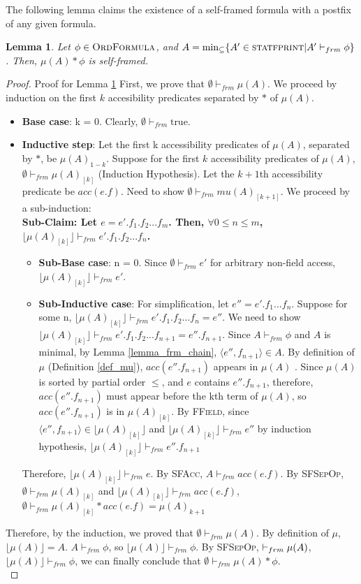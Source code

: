 \documentclass {article}
\newtheorem{lemma}[theorem]{Lemma}
\newcommand{\true}{\text{true}}
\newcommand{\frm}{\vdash_{frm}}
\begin{document}
The following lemma claims the existence of a self-framed formula with a postfix of any given formula.\\
\begin{lemma}
\label{lemma_mu}
Let $\phi \in \textsc{OrdFormula}$, and $A = \min_{\subseteq}\{A' \in \textsc{statfprint} | A' \frm \phi\}$. Then, $\mu(A) \ast \phi$ is self-framed.
\end{lemma}
\begin{proof} Proof for Lemma \ref{lemma_mu}
First, we prove that $\emptyset \frm \mu(A)$. We proceed by induction on the first $k$ accesibility predicates separated by $\ast$ of $\mu(A)$.
\begin{itemize}
    \item \textbf{Base case}: k = 0. Clearly, $\emptyset \frm \true$.
    \item \textbf{Inductive step}: Let the first k accessibility predicates of $\mu(A)$, separated by $\ast$, be $\mu(A)_{1-k}$. Suppose for the first $k$ accessibility predicates of $\mu(A)$, $\emptyset \frm \mu(A)_{[k]}$ (Induction Hypothesis). Let the $k+1$th accessibility predicate be $acc(e.f)$. Need to show $\emptyset \frm mu(A)_{[k+1]}$. We proceed by a sub-induction:\\
    \textbf{Sub-Claim: Let $e = e'.f_1.f_2...f_m$. Then, $\forall 0 \leqslant n \leqslant m$, $\lfloor \mu(A)_{[k]} \rfloor \frm e'.f_1.f_2...f_n$.}
    \begin{itemize}
        \item \textbf{Sub-Base case}: n = 0. Since $\emptyset \frm e'$ for arbitrary non-field access, $\lfloor \mu(A)_{[k]} \rfloor \frm e'$.
        \item\textbf{ Sub-Inductive case}: For simplification, let $e'' = e'.f_1...f_n$. Suppose for some n, $\lfloor \mu(A)_{[k]} \rfloor \frm e'.f_1.f_2...f_n = e''$.  We need to show $\lfloor \mu(A)_{[k]} \rfloor \frm e'.f_1.f_2...f_{n+1} = e''.f_{n+1}$.  Since $A \frm \phi$ and $A$ is minimal, by Lemma \ref{lemma_frm_chain}, $\langle e'',f_{n+1} \rangle \in A$. By definition of $\mu$ (Definition \ref{def_mu}), $acc(e''.f_{n+1})$ appears in $\mu(A)$ . Since $\mu(A)$ is sorted by partial order $\leq$, and $e$ contains $e''.f_{n+1}$, therefore, $acc(e''.f_{n+1})$ must appear before the kth term of $\mu(A)$, so $acc(e''.f_{n+1})$ is in $\mu(A)_{[k]}$. By \textsc{FField}, since $\langle e'',f_{n+1}\rangle \in \lfloor \mu(A)_{[k]} \rfloor$ and $\lfloor \mu(A)_{[k]} \rfloor \frm e''$ by induction hypothesis, $\lfloor \mu(A)_{[k]} \rfloor \frm e''.f_{n+1}$
    \end{itemize}
    Therefore, $\lfloor \mu(A)_{[k]} \rfloor \frm e$. By \textsc{SFAcc}, $A \frm acc(e.f)$. By \textsc{SFSepOp}, $\emptyset \frm \mu(A)_{[k]}$ and $\lfloor \mu(A)_{[k]} \rfloor \frm acc(e.f)$, $\emptyset \frm \mu(A)_{[k]} \ast acc(e.f) = \mu(A)_{k+1}$
\end{itemize}
Therefore, by the induction, we proved that $\emptyset \frm \mu(A)$. By definition of $\mu$, $\lfloor \mu(A) \rfloor = A$. $A \frm \phi$, so $\lfloor \mu(A) \rfloor \frm \phi$. By \textsc{SFSepOp}, $\empty \frm \mu(A)$, $\lfloor \mu(A) \rfloor \frm \phi$, we can finally conclude that $\emptyset \frm \mu(A) \ast \phi$.\\


\end{proof}
\end{document}
